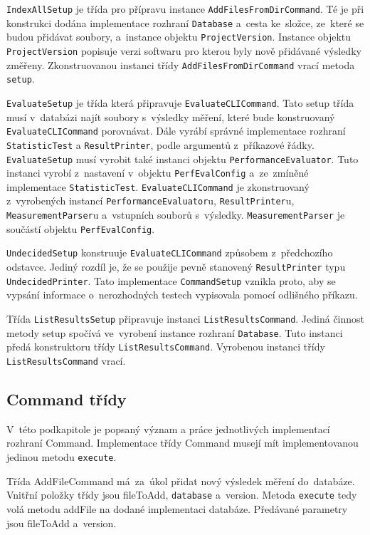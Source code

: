 \lstinline{IndexAllSetup} je třída pro přípravu instance \lstinline{AddFilesFromDirCommand}. Té je při konstrukci dodána
implementace rozhraní \lstinline{Database} a~cesta ke~složce, ze~které se budou přidávat soubory,
a~instance objektu \lstinline{ProjectVersion}. Instance objektu \lstinline{ProjectVersion} popisuje verzi softwaru pro kterou
byly nově přidávané výsledky změřeny. Zkonstruovanou instanci třídy \lstinline{AddFilesFromDirCommand} vrací metoda \lstinline{setup}.

\lstinline{EvaluateSetup} je třída která připravuje \lstinline{EvaluateCLICommand}. Tato setup třída musí v~databázi najít
soubory s~výsledky měření, které bude konstruovaný \lstinline{EvaluateCLICommand} porovnávat. Dále vyrábí správné
implementace rozhraní \lstinline{StatisticTest} a \lstinline{ResultPrinter}, podle argumentů z~příkazové řádky.
\lstinline{EvaluateSetup} musí vyrobit také instanci objektu \lstinline{PerformanceEvaluator}. Tuto instanci vyrobí
z~nastavení v~objektu \lstinline{PerfEvalConfig} a~ze~zmíněné implementace \lstinline{StatisticTest}. \lstinline{EvaluateCLICommand} je zkonstruovaný
z~vyrobených instancí \lstinline{PerformanceEvaluator}u, \lstinline{ResultPrinter}u, \lstinline{MeasurementParser}u a~vstupních souborů s~výsledky.
\lstinline{MeasurementParser} je součástí objektu \lstinline{PerfEvalConfig}.

\lstinline{UndecidedSetup} konstruuje \lstinline{EvaluateCLICommand} způsobem z~předchozího odstavce.
Jediný rozdíl je, že se použije pevně stanovený \lstinline{ResultPrinter} typu \lstinline{UndecidedPrinter}.
Tato implementace \lstinline{CommandSetup} vznikla proto, aby se vypsání informace o~nerozhodných
testech vypisovala pomocí odlišného příkazu.

Třída \lstinline{ListResultsSetup} připravuje instanci \lstinline{ListResultsCommand}. Jediná činnost metody setup
spočívá ve~vyrobení instance rozhraní \lstinline{Database}. Tuto instanci předá konstruktoru
třídy \lstinline{ListResultsCommand}. Vyrobenou instanci třídy \lstinline{ListResultsCommand} vrací.

\subsection{Command třídy}

V~této podkapitole je popsaný význam a práce jednotlivých implementací rozhraní Command.
Implementace třídy Command musejí mít implementovanou jedinou metodu \lstinline{execute}.

Třída AddFileCommand má~za~úkol přidat nový výsledek měření do~databáze. Vnitřní položky
třídy jsou fileToAdd, \lstinline{database} a~version. Metoda \lstinline{execute} tedy volá metodu addFile na dodané implementaci
databáze. Předávané parametry jsou fileToAdd a~version.

